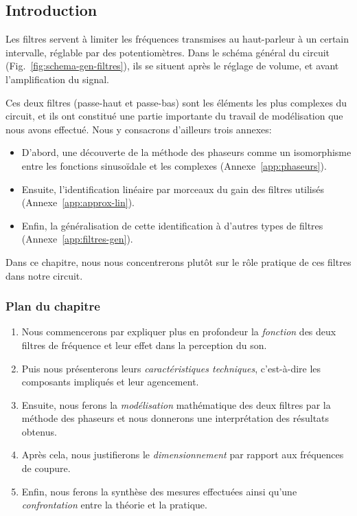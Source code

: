 \subsection*{Introduction}

Les filtres servent à limiter les fréquences transmises au haut-parleur
à un certain intervalle, réglable par des potentiomètres.
Dans le schéma général du circuit (Fig.~\ref{fig:schema-gen-filtres}),
ils se situent après le réglage de volume, et avant l'amplification du signal.

Ces deux filtres (passe-haut et passe-bas) sont les éléments les plus complexes
du circuit, et ils ont constitué
une partie importante du travail de modélisation que nous avons effectué.
Nous y consacrons d'ailleurs trois annexes:
\begin{itemize}
    \item D'abord, une découverte de la méthode des phaseurs comme un isomorphisme
        entre les fonctions sinusoïdale et les complexes
        (Annexe~\ref{app:phaseurs}).
    \item Ensuite,
        l'identification linéaire par morceaux du gain des filtres utilisés
        (Annexe~\ref{app:approx-lin}).
    \item Enfin,
        la généralisation de cette identification à d'autres types de filtres
        (Annexe~\ref{app:filtres-gen}).
\end{itemize}

Dans ce chapitre,
nous nous concentrerons plutôt sur le rôle pratique de ces filtres
dans notre circuit.

\subsubsection*{Plan du chapitre}
\begin{enumerate}
    \item Nous commencerons par expliquer plus en profondeur la \emph{fonction}
        des deux filtres de fréquence et leur effet dans la perception du son.
    \item Puis nous présenterons leurs \emph{caractéristiques techniques},
        c'est-à-dire les composants impliqués et leur agencement.
    \item Ensuite, nous ferons la \emph{modélisation} mathématique
        des deux filtres
        par la méthode des phaseurs et nous donnerons une interprétation
		des résultats obtenus.
    \item Après cela, nous justifierons le \emph{dimensionnement} par rapport
        aux fréquences de coupure.
    \item Enfin, nous ferons la synthèse des mesures effectuées ainsi qu'une
        \emph{confrontation} entre la théorie et la pratique.
\end{enumerate}
